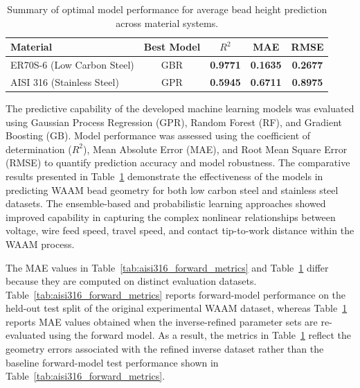 \documentclass[11pt]{article}
\begin{document}
\begin{table}[htbp]
\centering
\caption{Summary of optimal model performance for average bead height prediction across material systems.}
\label{tab:model_performance_summary}

\renewcommand{\arraystretch}{1.2}

\begin{tabular}{lcccc}
\toprule
\textbf{Material} & \textbf{Best Model} & \textbf{$R^{2}$} & \textbf{MAE} & \textbf{RMSE} \\
\midrule

ER70S-6 (Low Carbon Steel) 
& GBR 
& \textbf{0.9771} 
& \textbf{0.1635} 
& \textbf{0.2677} \\

AISI 316 (Stainless Steel) 
& GPR 
& \textbf{0.5945} 
& \textbf{0.6711} 
& \textbf{0.8975} \\

\bottomrule
\end{tabular}

\end{table}



The predictive capability of the developed machine learning models was evaluated using Gaussian Process Regression (GPR), Random Forest (RF), and Gradient Boosting (GB). Model performance was assessed using the coefficient of determination ($R^{2}$), Mean Absolute Error (MAE), and Root Mean Square Error (RMSE) to quantify prediction accuracy and model robustness. The comparative results presented in Table~\ref{tab:model_performance_summary} demonstrate the effectiveness of the models in predicting WAAM bead geometry for both low carbon steel and stainless steel datasets. The ensemble-based and probabilistic learning approaches showed improved capability in capturing the complex nonlinear relationships between voltage, wire feed speed, travel speed, and contact tip-to-work distance within the WAAM process.

The MAE values in Table~\ref{tab:aisi316_forward_metrics} and Table~\ref{tab:model_performance_summary} differ because they are computed on distinct evaluation datasets. 
Table~\ref{tab:aisi316_forward_metrics} reports forward-model performance on the held-out test split of the original experimental WAAM dataset, whereas
Table~\ref{tab:model_performance_summary} reports MAE values obtained when the inverse-refined parameter sets are re-evaluated using the forward model. As a result, the metrics in Table~\ref{tab:model_performance_summary} reflect the geometry errors associated with the refined inverse dataset rather than the baseline forward-model test performance shown in Table~\ref{tab:aisi316_forward_metrics}.
\end{document}
